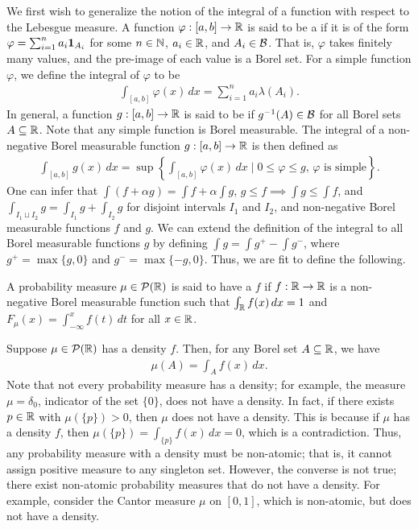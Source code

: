 We first wish to generalize the notion of the integral of a function with respect to the Lebesgue measure. A function $\varphi:[a,b] \to \mathbb{R}$ is said to be a  if it is of the form $\varphi = \sum_{i=1}^{n} a_{i}\textbf{1}_{A_{i}}$ for some $n \in \mathbb{N}$, $a_{i} \in \mathbb{R}$, and $A_{i} \in \mathcal{B}$. That is, $\varphi$ takes finitely many values, and the pre-image of each value is a Borel set. For a simple function $\varphi$, we define the integral of $\varphi$ to be
\begin{align}
    \int_{[a,b]} \varphi(x) \, dx = \sum_{i=1}^{n} a_{i}\lambda(A_{i}).
\end{align}
In general, a function $g:[a,b] \to \mathbb{R}$ is said to be  if $g^{-1}(A) \in \mathcal{B}$ for all Borel sets $A \subseteq \mathbb{R}$. Note that any simple function is Borel measurable. The integral of a non-negative Borel measurable function $g:[a,b] \to \mathbb{R}$ is then defined as
\begin{align}
    \int_{[a,b]} g(x) \, dx = \sup\left\{\int_{[a,b]} \varphi(x) \, dx \; \Big| \; 0 \leq \varphi \leq g, \, \varphi \text{ is simple}\right\}.
\end{align}
One can infer that $\int(f+\alpha g) = \int f + \alpha \int g$, $g \leq f \implies \int g \leq \int f$, and $\int_{I_{1} \sqcup I_{2}} g = \int_{I_{1}} g + \int_{I_{2}} g$ for disjoint intervals $I_{1}$ and $I_{2}$, and non-negative Borel measurable functions $f$ and $g$. We can extend the definition of the integral to all Borel measurable functions $g$ by defining $\int g = \int g^{+} - \int g^{-}$, where $g^{+} = \max\{g,0\}$ and $g^{-} = \max\{-g,0\}$. Thus, we are fit to define the following.

\begin{definition}
    A probability measure $\mu \in \mathcal{P}(\mathbb{R})$ is said to have a  $f$ if $f:\mathbb{R} \to \mathbb{R}$ is a non-negative Borel measurable function such that $\int_{\mathbb{R}} f(x) \, dx = 1$ and $F_{\mu}(x) = \int_{-\infty}^{x} f(t) \, dt$ for all $x \in \mathbb{R}$. 
\end{definition}

Suppose $\mu \in \mathcal{P}(\mathbb{R})$ has a density $f$. Then, for any Borel set $A \subseteq \mathbb{R}$, we have
\begin{align}
    \mu(A) = \int_{A} f(x) \, dx.
\end{align}
Note that not every probability measure has a density; for example, the measure $\mu = \delta_{0}$, indicator of the set $\{0\}$, does not have a density. In fact, if there exists $p \in \mathbb{R}$ with $\mu(\{p\}) > 0$, then $\mu$ does not have a density. This is because if $\mu$ has a density $f$, then $\mu(\{p\}) = \int_{\{p\}} f(x) \, dx = 0$, which is a contradiction. Thus, any probability measure with a density must be non-atomic; that is, it cannot assign positive measure to any singleton set. However, the converse is not true; there exist non-atomic probability measures that do not have a density. For example, consider the Cantor measure $\mu$ on $[0,1]$, which is non-atomic, but does not have a density.

